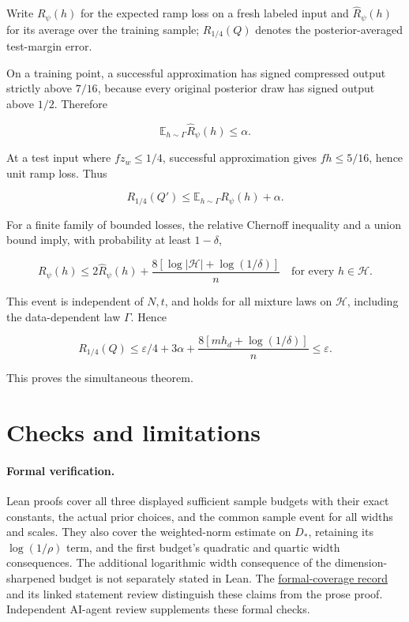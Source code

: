 \documentclass[11pt]{article}
\begin{document}
Write \(R_\psi(h)\) for the expected ramp loss on a fresh labeled input and
\(\widehat R_\psi(h)\) for its average over the training sample;
\(R_{1/4}(Q)\) denotes the posterior-averaged test-margin error.

On a training point, a successful approximation has signed compressed
output strictly above \(7/16\), because every original posterior draw
has signed output above \(1/2\). Therefore

\[
\mathbb E_{h\sim\Gamma}\widehat R_\psi(h)\le\alpha.
\]

At a test input where \(fz_w\le1/4\), successful approximation gives
\(fh\le5/16\), hence unit ramp loss. Thus

\[
R_{1/4}(Q')\le\mathbb E_{h\sim\Gamma}R_\psi(h)+\alpha.
\]

For a finite family of bounded losses, the relative Chernoff inequality
and a union bound imply, with probability at least \(1-\delta\),

\[
R_\psi(h)\le2\widehat R_\psi(h)
+\frac{8[\log|\mathcal H|+\log(1/\delta)]}{n}
\quad\text{for every }h\in\mathcal H.
\]

This event is independent of \(N,t\), and holds for all mixture laws on
\(\mathcal H\), including the data-dependent law \(\Gamma\). Hence

\[
R_{1/4}(Q)\le\varepsilon/4+3\alpha
+\frac{8[mh_d+\log(1/\delta)]}{n}\le\varepsilon.
\]

This proves the simultaneous theorem.

\section{Checks and limitations}\label{checks-and-limitations}

\paragraph{Formal verification.}
Lean proofs cover all three displayed sufficient sample budgets with
their exact constants, the actual prior choices, and the common sample
event for all widths and scales. They also cover the weighted-norm
estimate on \(D_*\), retaining its \(\log(1/\rho)\) term, and the first
budget's quadratic and quartic width consequences. The additional
logarithmic width consequence of the dimension-sharpened budget is not
separately stated in Lean. The
\href{https://github.com/kaarelh/AI-works/blob/main/neural-network-generalization/lean/review/BatchTwo-coverage.md}{formal-coverage record}
and its linked statement review distinguish these claims from the prose
proof. Independent AI-agent review supplements these formal checks.
\end{document}

